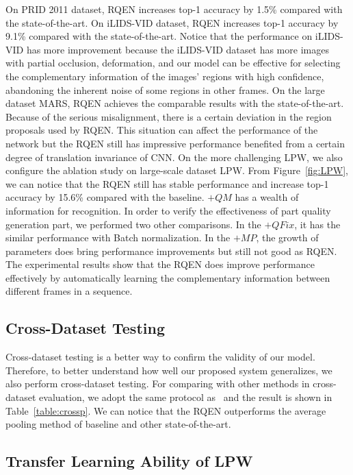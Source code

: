 \documentclass[letterpaper]{article} %
\begin{document}
 On PRID 2011 dataset, RQEN increases top-1 accuracy by 1.5\% compared with the state-of-the-art. On iLIDS-VID dataset, RQEN increases top-1 accuracy by 9.1\% compared with the state-of-the-art. Notice that the performance on iLIDS-VID has more improvement because the iLIDS-VID dataset has more images with partial occlusion, deformation, and our model can be effective for selecting the complementary information of the images' regions with high confidence, abandoning the inherent noise of some regions in other frames.
On the large dataset MARS, RQEN achieves the comparable results with the state-of-the-art. Because of the serious misalignment, there is a certain deviation in the region proposals used by RQEN. This situation can affect the performance of the network but the RQEN still has impressive performance benefited from a certain degree of translation invariance of CNN.
On the more challenging LPW, we also configure the ablation study on large-scale dataset LPW. From Figure~\ref{fig:LPW}, we can notice that the RQEN still has stable performance and increase top-1 accuracy by 15.6\% compared with the baseline. $+QM$ has a wealth of information for recognition. In order to verify the effectiveness of part quality generation part, we performed two other comparisons. In the $+QFix$, it has the similar performance with Batch normalization. In the $+MP$, the growth of parameters does bring performance improvements but still not good as RQEN. The experimental results show that the RQEN does improve performance effectively by automatically learning the complementary information between different frames in a sequence.



\subsection{Cross-Dataset Testing}


 Cross-dataset testing is a better way to confirm the validity of our model. Therefore, to better understand how well our proposed system generalizes, we also perform cross-dataset testing.
 For comparing with other methods in cross-dataset evaluation, we adopt the same protocol as~\cite{mclaughlin2016recurrent} and the result is shown in Table~\ref{table:crossp}. We can notice that the RQEN outperforms the average pooling method of baseline and other state-of-the-art.

 \subsection{Transfer Learning Ability of LPW}
\end{document}
